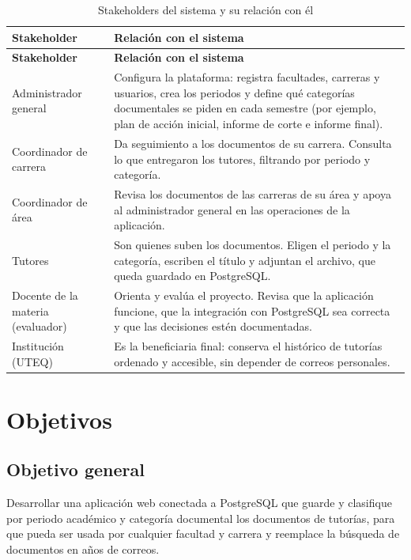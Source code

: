 \documentclass[12pt,a4paper,oneside]{article}
\begin{document}
\begin{longtable}{>{\raggedright\arraybackslash}p{3.7cm}>{\raggedright\arraybackslash}p{11.3cm}}
\caption{Stakeholders del sistema y su relación con él}\label{tab:stakeholders}\\
\toprule
\textbf{Stakeholder} & \textbf{Relación con el sistema} \\
\midrule
\endfirsthead
\toprule
\textbf{Stakeholder} & \textbf{Relación con el sistema} \\
\midrule
\endhead
Administrador general &
Configura la plataforma: registra facultades, carreras y usuarios, crea los periodos
y define qué categorías documentales se piden en cada semestre (por ejemplo, plan de
acción inicial, informe de corte e informe final). \\
\addlinespace
Coordinador de carrera &
Da seguimiento a los documentos de su carrera. Consulta lo que entregaron los tutores,
filtrando por periodo y categoría. \\
\addlinespace
Coordinador de área &
Revisa los documentos de las carreras de su área y apoya al administrador general en las operaciones de la aplicación. \\
\addlinespace
Tutores &
Son quienes suben los documentos. Eligen el periodo y la categoría, escriben el título
y adjuntan el archivo, que queda guardado en PostgreSQL. \\
\addlinespace
Docente de la materia (evaluador) &
Orienta y evalúa el proyecto. Revisa que la aplicación funcione, que la integración con
PostgreSQL sea correcta y que las decisiones estén documentadas. \\
\addlinespace
Institución (UTEQ) &
Es la beneficiaria final: conserva el histórico de tutorías ordenado y accesible,
sin depender de correos personales. \\
\bottomrule
\end{longtable}

\section{Objetivos}

\subsection{Objetivo general}

Desarrollar una aplicación web conectada a PostgreSQL que guarde y clasifique por
periodo académico y categoría documental los documentos de tutorías, para que pueda
ser usada por cualquier facultad y carrera y reemplace la búsqueda de documentos en
años de correos.
\end{document}
